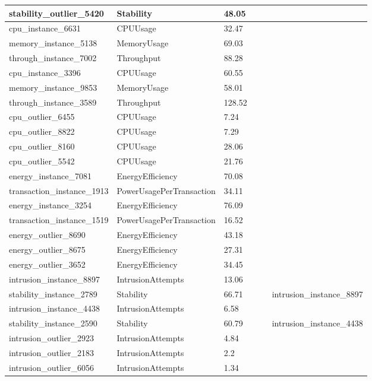 \begin{longtable}{|l|p{2cm}|l|l|p{3cm}|p{3cm}|}
stability\_outlier\_5420 & Stability & 48.05 &  &  &  \\ \hline
cpu\_instance\_6631 & CPUUsage & 32.47 &  &  &  \\ \hline
memory\_instance\_5138 & MemoryUsage & 69.03 &  &  &  \\ \hline
through\_instance\_7002 & Throughput & 88.28 &  &  &  \\ \hline
cpu\_instance\_3396 & CPUUsage & 60.55 &  &  &  \\ \hline
memory\_instance\_9853 & MemoryUsage & 58.01 &  &  &  \\ \hline
through\_instance\_3589 & Throughput & 128.52 &  &  &  \\ \hline
cpu\_outlier\_6455 & CPUUsage & 7.24 &  &  &  \\ \hline
cpu\_outlier\_8822 & CPUUsage & 7.29 &  &  &  \\ \hline
cpu\_outlier\_8160 & CPUUsage & 28.06 &  &  &  \\ \hline
cpu\_outlier\_5542 & CPUUsage & 21.76 &  &  &  \\ \hline
energy\_instance\_7081 & EnergyEfficiency & 70.08 &  &  &  \\ \hline
transaction\_instance\_1913 & PowerUsagePerTransaction & 34.11 &  &  &  \\ \hline
energy\_instance\_3254 & EnergyEfficiency & 76.09 &  &  &  \\ \hline
transaction\_instance\_1519 & PowerUsagePerTransaction & 16.52 &  &  &  \\ \hline
energy\_outlier\_8690 & EnergyEfficiency & 43.18 &  &  &  \\ \hline
energy\_outlier\_8675 & EnergyEfficiency & 27.31 &  &  &  \\ \hline
energy\_outlier\_3652 & EnergyEfficiency & 34.45 &  &  &  \\ \hline
intrusion\_instance\_8897 & IntrusionAttempts & 13.06 &  &  &  \\ \hline
stability\_instance\_2789 & Stability & 66.71 &  &  & intrusion\_instance\_8897 \\ \hline
intrusion\_instance\_4438 & IntrusionAttempts & 6.58 &  &  &  \\ \hline
stability\_instance\_2590 & Stability & 60.79 &  &  & intrusion\_instance\_4438 \\ \hline
intrusion\_outlier\_2923 & IntrusionAttempts & 4.84 &  &  &  \\ \hline
intrusion\_outlier\_2183 & IntrusionAttempts & 2.2 &  &  &  \\ \hline
intrusion\_outlier\_6056 & IntrusionAttempts & 1.34 &  &  &  \\ \hline

\end{longtable}
